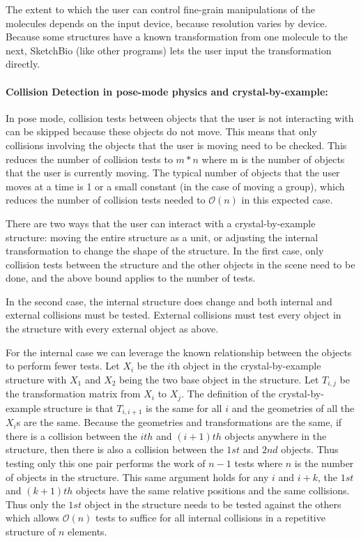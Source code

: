 \documentclass[twocolumn]{bmcart}%
\begin{document}
The extent to which the user can control fine-grain manipulations of the molecules depends on the input device, because resolution varies by device. Because some structures have a known transformation from one molecule to the next, SketchBio (like other programs) lets the user input the transformation directly.

\paragraph*{Collision Detection in pose-mode physics and crystal-by-example:}
In pose mode, collision tests between objects that the user is not interacting with can be skipped because these objects do not move.
This means that only collisions involving the objects that the user is moving need to be checked.
This reduces the number of collision tests to $m*n$ where m is the number of objects that the user is currently moving.
The typical number of objects that the user moves at a time is 1 or a small constant (in the case of moving a group), which reduces the number of collision tests needed to $\mathcal{O}(n)$ in this expected case.

There are two ways that the user can interact with a crystal-by-example structure: moving the entire structure as a unit, or adjusting the internal transformation to change the shape of the structure.
In the first case, only collision tests between the structure and the other objects in the scene need to be done, and the above bound applies to the number of tests.

In the second case, the internal structure does change and both internal and external collisions must be tested.
External collisions must test every object in the structure with every external object as above.

For the internal case we can leverage the known relationship between the objects to perform fewer tests.  Let $X_i$ be the $i$th object in the crystal-by-example structure with $X_1$ and $X_2$ being the two base object in the structure.
Let $T_{i,j}$ be the transformation matrix from $X_i$ to $X_j$.
The definition of the crystal-by-example structure is that $T_{i,i+1}$ is the same for all $i$ and the geometries of all the $X_i$s are the same.
Because the geometries and transformations are the same, if there is a collision between the $ith$ and $(i+1)th$ objects anywhere in the structure, then there is also a collision between the $1st$ and $2nd$ objects.
Thus testing only this one pair performs the work of $n-1$ tests where $n$ is the number of objects in the structure.
This same argument holds for any $i$ and $i+k$, the $1st$ and $(k+1)th$ objects have the same relative positions and the same collisions.
Thus only the $1st$ object in the structure needs to be tested against the others which allows $\mathcal{O}(n)$ tests to suffice for all internal collisions in a repetitive structure of $n$ elements.
\end{document}
